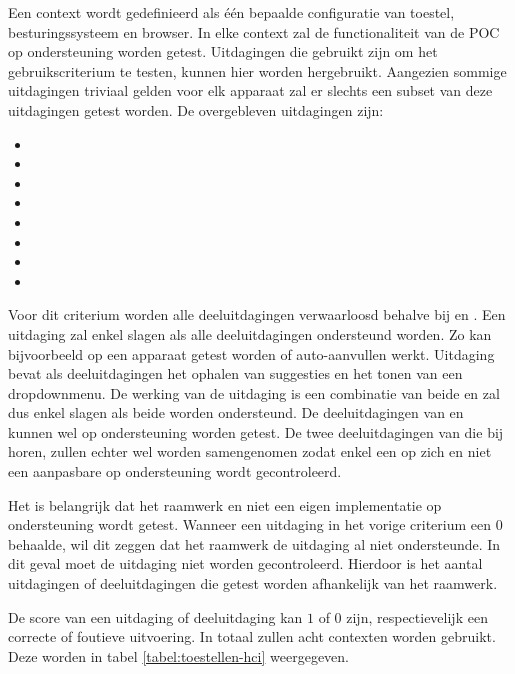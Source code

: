 Een context wordt gedefinieerd als één bepaalde configuratie van toestel, besturingssysteem en browser.
In elke context zal de functionaliteit van de POC op ondersteuning worden getest.
Uitdagingen die gebruikt zijn om het gebruikscriterium te testen, kunnen hier worden hergebruikt.
Aangezien sommige uitdagingen triviaal gelden voor elk apparaat zal er slechts een subset van deze uitdagingen getest worden.
De overgebleven uitdagingen zijn:
\begin{itemize}
 \item {}
 \item {}
 \item {}
 \item {}
 \item {}
 \item {}
 \item {}
 \item {}
\end{itemize}
Voor dit criterium worden alle deeluitdagingen verwaarloosd behalve bij  en .
Een uitdaging zal enkel slagen als alle deeluitdagingen ondersteund worden.
Zo kan bijvoorbeeld op een apparaat getest worden of auto-aanvullen werkt.
Uitdaging  bevat als deeluitdagingen het ophalen van suggesties en het tonen van een dropdownmenu.
De werking van de uitdaging is een combinatie van beide en zal dus enkel slagen als beide worden ondersteund.
De deeluitdagingen van  en  kunnen wel op ondersteuning worden getest.
De twee deeluitdagingen van  die bij  horen, zullen echter wel worden samengenomen zodat enkel een  op zich en niet een aanpasbare  op ondersteuning wordt gecontroleerd.


Het is belangrijk dat het raamwerk en niet een eigen implementatie op ondersteuning wordt getest.
Wanneer een uitdaging in het vorige criterium een $0$ behaalde, wil dit zeggen dat het raamwerk de uitdaging al niet ondersteunde.
In dit geval moet de uitdaging niet worden gecontroleerd.
Hierdoor is het aantal uitdagingen of deeluitdagingen die getest worden afhankelijk van het raamwerk.


De score van een uitdaging of deeluitdaging kan $1$ of $0$ zijn, respectievelijk een correcte of foutieve uitvoering.
In totaal zullen acht contexten worden gebruikt.
Deze worden in tabel \ref{tabel:toestellen-hci} weergegeven.

